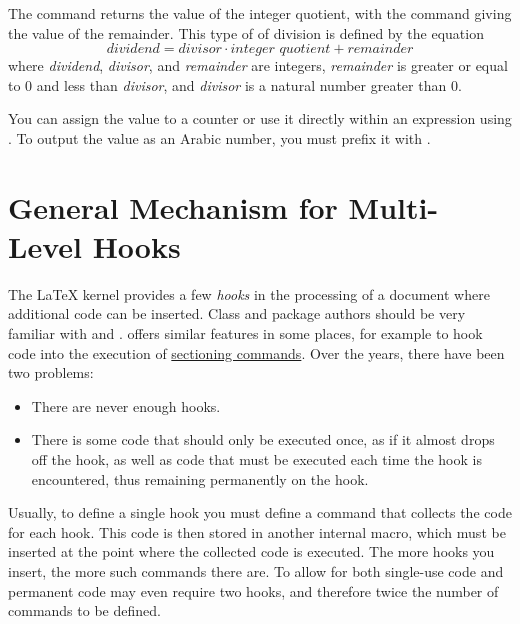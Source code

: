 \begin{Declaration}
\end{Declaration}%
The  command returns the
value of the integer quotient, with the  command giving the value
of the remainder. This type of of division is defined by the equation
\[
\textit{dividend} = \textit{divisor} \cdot
\textit{integer quotient} + \textit{remainder}
\]
where \textit{dividend}, \textit{divisor}, and \textit{remainder} are
integers, \textit{remainder} is greater or equal to 0 and less than
\textit{divisor}, and \textit{divisor} is a natural number greater than 0.

You can assign the value to a counter or use it directly within an expression
using . To output the value as an Arabic number, you must
prefix it with .%
%
\EndIndexGroup


\section[{General Mechanism for Multi-Level Hooks}]
{General Mechanism for Multi-Level
  Hooks}

\BeginIndexGroup
{}
The \LaTeX{} kernel provides a few \emph{hooks} in the processing of
a document where additional code can be inserted. Class and package authors
should be very familiar with  and
. \KOMAScript{} offers similar features in some places,
for example to hook code into the execution of
\hyperref[sec:maincls.structure]{sectioning commands}. Over the years, there
have been two problems:
\begin{itemize}
  \item There are never enough hooks.
  \item There is some code that should only be executed once, as if it almost
  drops off the hook, as well as code that must be executed each time the
  hook is encountered, thus remaining permanently on the hook.
\end{itemize}
Usually, to define a single hook you must define a command that collects the
code for each hook. This code is then stored in another internal macro, which
must be inserted at the point where the collected code is executed. The more
hooks you insert, the more such commands there are. To allow for both
single-use code and permanent code may even require two hooks, and therefore
twice the number of commands to be defined.


